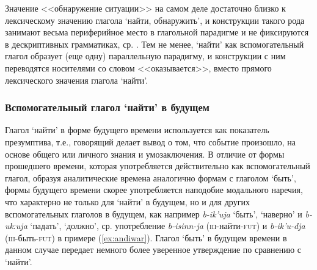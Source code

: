 Значение <<обнаружение ситуации>> на самом деле достаточно близко к лексическому значению глагола `найти, обнаружить', и конструкции такого рода занимают весьма периферийное место в глагольной парадигме и не фиксируются в дескриптивных грамматиках, ср. \citep[128]{danielmaisak2018}. Тем не менее, `найти' как вспомогательный глагол образует (еще одну) параллельную парадигму, и конструкции с ним переводятся носителями со словом <<оказывается>>, вместо прямого лексического значения глагола `найти'.

\subsubsection{Вспомогательный глагол `найти' в будущем} \label{sec:findfuture}

Глагол `найти' в форме будущего времени используется как показатель презумптива, т.е., говорящий делает вывод о том, что событие произошло, на основе общего или личного знания и умозаключения. В отличие от формы прошедшего времени, которая употребляется действительно как вспомогательный глагол, образуя аналитические времена аналогично формам с глаголом `быть', формы будущего времени скорее употребляется наподобие модального наречия, что характерно не только для `найти' в будущем, но и для других вспомогательных глаголов в будущем, как например \textit{b-ik'uja} `быть', `наверно' и \textit{b-ukːuja} `падать', `должно', ср. употребление \textit{b-isinn-ja} (\textsc{iii}-найти-\textsc{fut}) и \textit{b-ik’u-dja} (\textsc{iii}-быть-\textsc{fut}) в примере (\ref{ex:andiwar}). Глагол `быть' в будущем времени в данном случае передает немного более уверенное утверждение по сравнению с `найти'.


